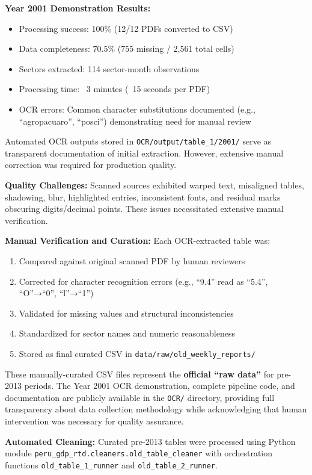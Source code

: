\documentclass[12pt]{article}
\begin{document}
\textbf{Year 2001 Demonstration Results:}
\begin{itemize}
\item Processing success: 100\% (12/12 PDFs converted to CSV)
\item Data completeness: 70.5\% (755 missing / 2,561 total cells)
\item Sectors extracted: 114 sector-month observations
\item Processing time: ~3 minutes (~15 seconds per PDF)
\item OCR errors: Common character substitutions documented (e.g., ``agropacuaro'', ``posci'') demonstrating need for manual review
\end{itemize}

Automated OCR outputs stored in \texttt{OCR/output/table\_1/2001/} serve as transparent documentation of initial extraction. However, extensive manual correction was required for production quality.

\textbf{Quality Challenges:} Scanned sources exhibited warped text, misaligned tables, shadowing, blur, highlighted entries, inconsistent fonts, and residual marks obscuring digits/decimal points. These issues necessitated extensive manual verification.

\textbf{Manual Verification and Curation:} Each OCR-extracted table was:
\begin{enumerate}
\item Compared against original scanned PDF by human reviewers
\item Corrected for character recognition errors (e.g., ``9.4'' read as ``5.4'', ``O''→``0'', ``l''→``1'')
\item Validated for missing values and structural inconsistencies
\item Standardized for sector names and numeric reasonableness
\item Stored as final curated CSV in \texttt{data/raw/old\_weekly\_reports/}
\end{enumerate}

These manually-curated CSV files represent the \textbf{official ``raw data''} for pre-2013 periods. The Year 2001 OCR demonstration, complete pipeline code, and documentation are publicly available in the \texttt{OCR/} directory, providing full transparency about data collection methodology while acknowledging that human intervention was necessary for quality assurance.

\textbf{Automated Cleaning:} Curated pre-2013 tables were processed using Python module \texttt{peru\_gdp\_rtd.cleaners.old\_table\_cleaner} with orchestration functions \texttt{old\_table\_1\_runner} and \texttt{old\_table\_2\_runner}.
\end{document}
